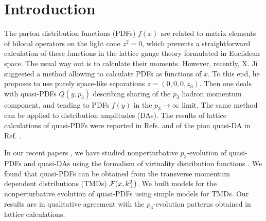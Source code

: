 \documentclass[aps,prd,twocolumn,showpacs,preprintnumbers,superscriptaddress,groupedaddress]{revtex4-1}
\begin{document}





















   
\section{ Introduction}


The parton distribution functions (PDFs) $f(x)$ \cite{Feynman:1973xc}
are  related to   matrix elements
of bilocal operators on   the light cone $z^2=0$, which prevents 
a straightforward calculation of these functions in  the   lattice 
 gauge  theory 
 formulated in  Euclidean space. 
  The usual way  out is to calculate  their moments. 
 However, recently, X. Ji  \cite{Ji:2013dva} suggested a method 
 allowing to calculate PDFs   as  functions of $x$. 
 To this end, he proposes to use purely space-like
separations $z=(0,0,0,z_3)$.  
Then one deals with  quasi-PDFs  $Q(y,p_3)$ describing sharing 
of   the $p_3$  hadron  momentum  component,  
and 
   tending  to  PDFs $f(y)$ 
     in the \mbox{$p_3 \to \infty$}  limit.
     The same method can be applied to distribution amplitudes (DAs).  
The results of lattice calculations of  
quasi-PDFs   were reported  
in Refs.  \cite{Lin:2014zya,Chen:2016utp,Alexandrou:2015rja}
and of the pion quasi-DA in Ref. \cite{Zhang:2017bzy}. 



In our recent papers \cite{Radyushkin:2016hsy,Radyushkin:2017gjd}, 
we  have studied  nonperturbative $p_3$-evolution of
quasi-PDFs and quasi-DAs 
using the formalism of  virtuality distribution functions 
 \cite{Radyushkin:2014vla,Radyushkin:2015gpa}.
 We found that  quasi-PDFs can be obtained from 
  the   transverse momentum dependent 
 distributions    (TMDs) ${\cal F} (x, k_\perp^2)$. We  
 built models for the    nonperturbative evolution of
quasi-PDFs using simple models for TMDs. 
Our results are in qualitative agreement with the
\mbox{$p_3$-evolution}   patterns  obtained in lattice calculations.    
\end{document}
